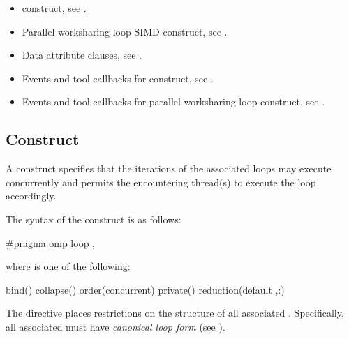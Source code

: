 \crossreferences
\begin{itemize}
\item {} construct, see
.

\item Parallel worksharing-loop SIMD construct, see
.

\item Data attribute clauses, see .

\item Events and tool callbacks for  construct, see
.

\item Events and tool callbacks for parallel worksharing-loop construct, see
.

\end{itemize}


\subsection{ Construct}
\label{subsec:loop Construct}
\summary
  A  construct specifies that the iterations of the associated
  loops may execute concurrently and permits the encountering thread(s) to
  execute the loop accordingly.

\syntax
\begin{ccppspecific}
The syntax of the  construct is as follows:
\begin{ompcPragma}
#pragma omp loop \plc{[clause[ [},\plc{] clause] ... ] new-line}
\end{ompcPragma}

where  is one of the following:

\begin{indentedcodelist}
bind()
collapse()
order(concurrent)
private()
reduction(\plc{[}default ,\plc{]reduction-identifier }:)
\end{indentedcodelist}
The  directive places restrictions on the structure of all associated .
Specifically, all associated  must have \emph{canonical loop form} (see
).
\end{ccppspecific}

